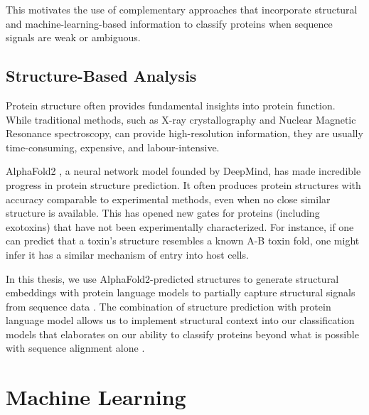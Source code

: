 This motivates the use of complementary approaches that incorporate structural and machine-learning-based information to classify proteins when sequence signals are weak or ambiguous.



\subsection{Structure-Based Analysis}

Protein structure often provides fundamental insights into protein function.
While traditional methods, such as X-ray crystallography and Nuclear Magnetic Resonance spectroscopy, can provide high-resolution information, they are usually time-consuming, expensive, and labour-intensive.

AlphaFold2 \cite{Jumper2021}, a neural network model founded by DeepMind, has made incredible progress in protein structure prediction.
It often produces protein structures with accuracy comparable to experimental methods, even when no close similar structure is available.
This has opened new gates for proteins (including exotoxins) that have not been experimentally characterized.
For instance, if one can predict that a toxin’s structure resembles a known A-B toxin fold, one might infer it has a similar mechanism of entry into host cells.

In this thesis, we use AlphaFold2-predicted structures to generate structural embeddings with protein language models to partially capture structural signals from sequence data \cite{rives2021biological}.
The combination of structure prediction with protein language model allows us to implement structural context into our classification models that elaborates on our ability to classify proteins beyond what is possible with sequence alignment alone \cite{rao2019evaluating}.



\section{Machine Learning}
\label{section:machine_learning}

